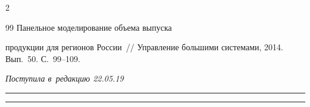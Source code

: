 \begin{multicols}{2}
{{\begin{thebibliography}{99}
   Панельное моделирование объема выпуска 


продукции для регионов России~// Управление большими системами, 2014. Вып.~50. С.~99--109.


\end{thebibliography}





 }


 }





\end{multicols}





\vspace*{-6pt}





\hfill{\small\textit{Поступила в~редакцию 22.05.19}}





\vspace*{8pt}




















\hrule





\vspace*{2pt}





\hrule










\def\tit{SELECTION OF OPTIMAL COMPLEXITY MODELS BY~METHODS OF~NONPARAMETRIC STATISTICS 


(ON~THE~EXAMPLE OF~PRODUCTION FUNCTION MODELS OF~THE~REGIONS OF~THE~RUSSIAN FEDERATION)}








